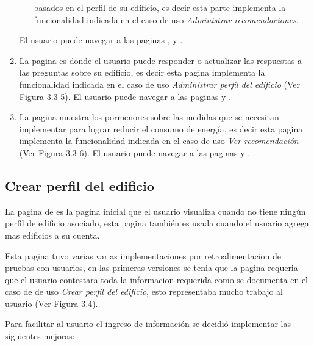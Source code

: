 \begin{enumerate}
\begin{itemize}
    basados en el perfil de su edificio, es decir esta parte
    implementa la funcionalidad indicada en el caso de uso
    \textit{Administrar recomendaciones}.
  \end{itemize}
  El usuario puede navegar a las paginas ,
   y .
\item La pagina  es donde el usuario
  puede responder o actualizar las respuestas a las preguntas sobre su edificio,
  es decir esta pagina implementa la funcionalidad indicada en el caso de uso
  \textit{Administrar perfil del edificio} (Ver Figura 3.3 5).
  El usuario puede navegar a las paginas  y
  .
\item La pagina  muestra los pormenores sobre
  las medidas que se necesitan implementar para lograr reducir el consumo de energía,
  es decir esta pagina implementa la funcionalidad indicada en el caso de uso
  \textit{Ver recomendación} (Ver Figura 3.3 6).
  El usuario puede navegar a las paginas  y
  .
\end{enumerate}


\subsection{Crear perfil del edificio}

La pagina de  es la pagina inicial
que el usuario visualiza cuando no tiene ningún perfil de edificio asociado,
esta pagina también es usada cuando el usuario agrega mas edificios a su
cuenta.

Esta pagina tuvo varias varias implementaciones por retroalimentacion de
pruebas con usuarios, en las primeras versiones se tenia que la pagina
requeria que el usuario contestara toda la informacion requerida como se
documenta en el caso de de uso \textit{Crear perfil del edificio}, esto
representaba mucho trabajo al usuario (Ver Figura 3.4).


Para facilitar al usuario el ingreso de información se decidió implementar
las siguientes mejoras:

